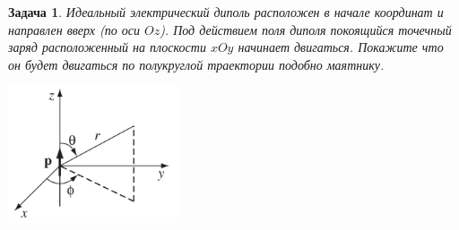\documentclass[a4paper,12pt]{article}
\newtheorem{problem}{Задача}
\numberwithin{equation}{section}
\begin{document}
\begin{problem}
    {\normalfont \cite[p.~166, Problem 3.56]{Griffiths:1492149}}
    Идеальный электрический диполь расположен в начале координат и направлен вверх (по оси $Oz$).
    Под действием поля диполя покоящийся точечный заряд расположенный на плоскости $xOy$ начинает двигаться.
    Покажите что он будет двигаться по полукруглой траектории подобно маятнику.
    \begin{center}
        \includegraphics[width=5cm]{2.png}
    \end{center}
\end{problem}
\end{document}
